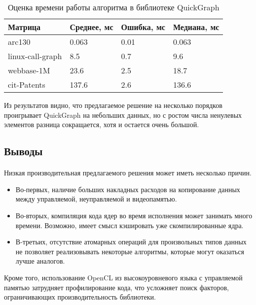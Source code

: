 \begin{table}[h]
    \begin{tabularx}{\textwidth}{|X|X|X|X|}
      \hline
      Матрица & Среднее, мс & Ошибка, мс & Медиана, мс \\
      \hline
      arc130 & 0.063 & 0.01 & 0.063 \\
      linux-call-graph & 8.5 & 0.7 & 9.6 \\
      webbase-1M & 23.6 & 2.5 & 18.7 \\
      cit-Patents & 137.6 & 2.6 & 136.6 \\ 
      \hline
    \end{tabularx}
  \caption{Оценка времени работы алгоритма в библиотеке QuickGraph}
  \label{tab:bfs-qg}
\end{table}


Из результатов видно, что предлагаемое решение на несколько порядков проигрывает QuickGraph на небольших данных, но с ростом числа ненулевых элементов разница сокращается, хотя и остается очень большой. 

\subsection{Выводы}
\paragraph{}

Низкая производительная предлагаемого решения может иметь нес\-коль\-ко причин.
\begin{itemize}
    \item Во-первых, наличие больших накладных расходов на копирование данных между управляемой, неуправляемой и видеопамятью.
    \item Во-вторых, компиляция кода ядер во время исполнения может занимать много времени. Возможно, имеет смысл кэшировать уже скомпилированные ядра.
    \item В-третьих, отсутствие атомарных операций для произвольных типов данных не позволяет реализовывать некоторые алгоритмы, которые могут оказаться лучше аналогов.
\end{itemize}

Кроме того, использование OpenCL из высокоуровневого языка с управляемой памятью затрудняет профилирование кода, что усложняет поиск факторов, ограничивающих производительность библиотеки.
